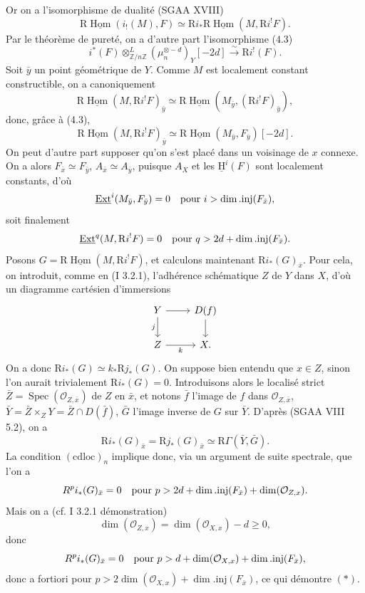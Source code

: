 \documentclass[11pt]{article}
\providecommand{\uH}{\underline{\mathrm H}}
\DeclareMathOperator{\Hom}{Hom}
\DeclareMathOperator{\Ext}{Ext}
\DeclareMathOperator{\Spec}{Spec}
\newcommand{\R}{\mathrm{R}}
\newcommand{\Z}{\mathbb{Z}}
\providecommand{\Hom}{\operatorname{Hom}}
\providecommand{\R}{\mathrm R}
\providecommand{\Z}{\mathbb Z}
\providecommand{\Spec}{\operatorname{Spec}}
\providecommand{\Spec}{\operatorname{Spec}}
\providecommand{\Hom}{\operatorname{Hom}}
\providecommand{\Spec}{\operatorname{Spec}}
\providecommand{\Spec}{\operatorname{Spec}}
\begin{document}
Or on a l'isomorphisme de dualité (SGAA XVIII)
\[
        \R\underline{\Hom}(i_!(M),F)\simeq \R i_*\R\underline{\Hom}(M,\R i^!F).
\]
Par le théorème de pureté, on a d'autre part l'isomorphisme (4.3)
\[
        i^*(F)\otimes^L_{\Z/n\Z}(\mu_n^{\otimes -d})_Y[-2d]\xrightarrow{\sim}\R i^!(F).
\]
Soit $\bar{y}$ un point géométrique de $Y$. Comme $M$ est localement constant constructible, on a canoniquement
\[
        \R\underline{\Hom}(M,\R i^!F)_{\bar{y}}\simeq \R\underline{\Hom}(M_{\bar{y}},(\R i^!F)_{\bar{y}}),
\]
donc, grâce à (4.3),
\[
        \R\underline{\Hom}(M,\R i^!F)_{\bar{y}}\simeq \R\underline{\Hom}(M_{\bar{y}},F_{\bar{y}})[-2d].
\]
On peut d'autre part supposer qu'on s'est placé dans un voisinage de $x$ connexe. On a alors $F_{\bar{x}}\simeq F_{\bar{y}}$, $A_{\bar{x}}\simeq A_{\bar{y}}$, puisque $A_X$ et les $\uH^i(F)$ sont localement constants, d'où
\[
        \underline{\Ext}^i(M_{\bar{y}},F_{\bar{y}})=0\quad\hbox{pour }i>\dim.\mathrm{inj}(F_{\bar{x}}),
\]
soit finalement
\[
        \underline{\Ext}^{q}(M,\R i^!F)=0\quad\hbox{pour }q>2d+\dim.\mathrm{inj}(F_{\bar{x}}).
\]
Posons $G=\R\underline{\Hom}(M,\R i^!F)$, et calculons maintenant $\R i_*(G)_{\bar{x}}$. Pour cela, on introduit, comme en (I 3.2.1), l'adhérence schématique $Z$ de $Y$ dans $X$, d'où un diagramme cartésien d'immersions
\[
\begin{tikzcd}
Y \arrow[r] \arrow[d,"j"'] & D(f) \arrow[d]\\
Z \arrow[r,"k"'] & X.
\end{tikzcd}
\]
On a donc $\R i_*(G)\simeq k_*\R j_*(G)$. On suppose bien entendu que $x\in Z$, sinon l'on aurait trivialement $\R i_*(G)=0$. Introduisons alors le localisé strict $\bar{Z}=\Spec(\mathcal{O}_{Z,\bar{x}})$ de $Z$ en $\bar{x}$, et notons $\bar{f}$ l'image de $f$ dans $\mathcal{O}_{Z,\bar{x}}$, $\bar{Y}=\bar{Z}\times_ZY=\bar{Z}\cap D(\bar{f})$, $\bar{G}$ l'image inverse de $G$ sur $\bar{Y}$. D'après (SGAA VIII 5.2), on a
\[
        \R i_*(G)_{\bar{x}}=\R j_*(G)_{\bar{x}}\simeq \R\Gamma(\bar{Y},\bar{G}).
\]
La condition $(\mathrm{cdloc})_n$ implique donc, via un argument de suite spectrale, que l'on a
\[
        R^p i_*(G)_{\bar{x}}=0\quad\hbox{pour }p>2d+\dim.\mathrm{inj}(F_{\bar{x}})+\dim(\mathcal{O}_{Z,x}).
\]
Mais on a (cf. I 3.2.1 démonstration)
\[
        \dim(\mathcal{O}_{Z,x})=\dim(\mathcal{O}_{X,x})-d\geq0,
\]
donc
\[
        R^p i_*(G)_{\bar{x}}=0\quad\hbox{pour }p>d+\dim(\mathcal{O}_{X,x})+\dim.\mathrm{inj}(F_{\bar{x}}),
\]
donc a fortiori pour $p>2\dim(\mathcal{O}_{X,x})+\dim.\mathrm{inj}(F_{\bar{x}})$, ce qui démontre $(*)$.
\end{document}
